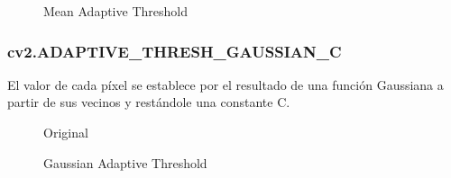 \begin{figure}[H]
  \centering \setlength\fboxsep{0pt} \setlength\fboxrule{0.5pt}
  \caption{Mean Adaptive Threshold}
\end{figure}

\subsubsection{cv2.ADAPTIVE\_THRESH\_GAUSSIAN\_C}\label{tecnica:threshold-adaptativo-gauss}
El valor de cada píxel se establece por el resultado de una función
Gaussiana a partir de sus vecinos y restándole una constante C.

\begin{figure}[H]
  \caption{Original}
  \centering \setlength\fboxsep{0pt} \setlength\fboxrule{0.5pt}
\end{figure}

\begin{figure}[H]
  \centering \setlength\fboxsep{0pt} \setlength\fboxrule{0.5pt}
  \caption{Gaussian Adaptive Threshold}
\end{figure}

